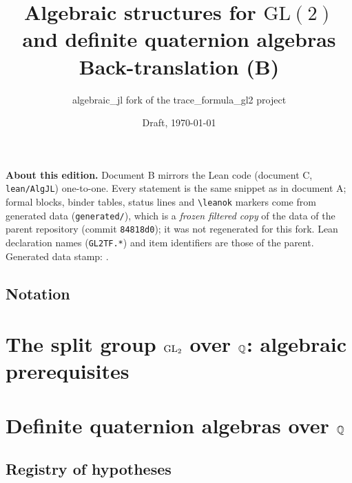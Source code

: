 \documentclass[11pt,twoside]{book}
\title{Algebraic structures for $\mathrm{GL}(2)$ and definite quaternion algebras\\[1ex]\normalsize Back-translation (B)}
\author{algebraic\_jl fork of the trace\_formula\_gl2 project}
\date{Draft, \today}
\begin{document}
\frontmatter
\maketitle
\noindent\textbf{About this edition.} Document B mirrors the Lean code (document C, \texttt{lean/AlgJL}) one-to-one.
Every statement is the same snippet as in document A; formal blocks, binder tables, status lines and
\texttt{\textbackslash leanok} markers come from generated data (\texttt{generated/}), which is a \emph{frozen filtered copy}
of the data of the parent repository (commit \texttt{84818d0}); it was not regenerated for this fork. Lean declaration names
(\texttt{GL2TF.*}) and item identifiers are those of the parent. Generated data stamp: \tfgenstampline.
\par\medskip
\tableofcontents
\mainmatter

\chapter*{Notation}


\part{The split group $\mathrm{GL}_2$ over $\mathbb{Q}$: algebraic prerequisites}
















\part{Definite quaternion algebras over $\mathbb{Q}$}




\appendix

\chapter{Registry of hypotheses}\label{ch:hypotheses}


\backmatter
\printbibliography
\end{document}
